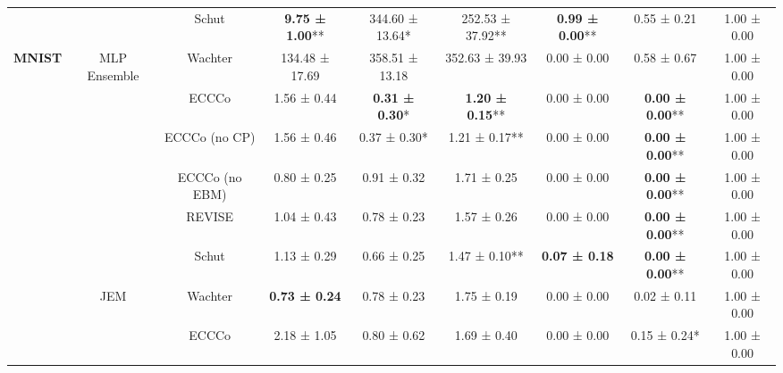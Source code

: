 \begin{table}
{\begin{tabular}[t]{>{}c|c|c|c|c|c|c|c|c}
 &  & Schut & \textbf{9.75 ± 1.00}** & 344.60 ± 13.64*\hphantom{*} & 252.53 ± 37.92** & \textbf{0.99 ± 0.00}** & 0.55 ± 0.21\hphantom{*}\hphantom{*} & 1.00 ± 0.00\hphantom{*}\hphantom{*}\\

\multirow{-16}{*}{\centering\arraybackslash \textbf{MNIST}} & \multirow{-4}{*}{\centering\arraybackslash MLP Ensemble} & Wachter & 134.48 ± 17.69\hphantom{*}\hphantom{*} & 358.51 ± 13.18\hphantom{*}\hphantom{*} & 352.63 ± 39.93\hphantom{*}\hphantom{*} & 0.00 ± 0.00\hphantom{*}\hphantom{*} & 0.58 ± 0.67\hphantom{*}\hphantom{*} & 1.00 ± 0.00\hphantom{*}\hphantom{*}\\
\cline{1-9}
 &  & ECCCo & 1.56 ± 0.44\hphantom{*}\hphantom{*} & \textbf{0.31 ± 0.30}*\hphantom{*} & \textbf{1.20 ± 0.15}** & 0.00 ± 0.00\hphantom{*}\hphantom{*} & \textbf{0.00 ± 0.00}** & 1.00 ± 0.00\hphantom{*}\hphantom{*}\\

 &  & ECCCo (no CP) & 1.56 ± 0.46\hphantom{*}\hphantom{*} & 0.37 ± 0.30*\hphantom{*} & 1.21 ± 0.17** & 0.00 ± 0.00\hphantom{*}\hphantom{*} & \textbf{0.00 ± 0.00}** & 1.00 ± 0.00\hphantom{*}\hphantom{*}\\

 &  & ECCCo (no EBM) & 0.80 ± 0.25\hphantom{*}\hphantom{*} & 0.91 ± 0.32\hphantom{*}\hphantom{*} & 1.71 ± 0.25\hphantom{*}\hphantom{*} & 0.00 ± 0.00\hphantom{*}\hphantom{*} & \textbf{0.00 ± 0.00}** & 1.00 ± 0.00\hphantom{*}\hphantom{*}\\

 &  & REVISE & 1.04 ± 0.43\hphantom{*}\hphantom{*} & 0.78 ± 0.23\hphantom{*}\hphantom{*} & 1.57 ± 0.26\hphantom{*}\hphantom{*} & 0.00 ± 0.00\hphantom{*}\hphantom{*} & \textbf{0.00 ± 0.00}** & 1.00 ± 0.00\hphantom{*}\hphantom{*}\\

 &  & Schut & 1.13 ± 0.29\hphantom{*}\hphantom{*} & 0.66 ± 0.25\hphantom{*}\hphantom{*} & 1.47 ± 0.10** & \textbf{0.07 ± 0.18}\hphantom{*}\hphantom{*} & \textbf{0.00 ± 0.00}** & 1.00 ± 0.00\hphantom{*}\hphantom{*}\\

 & \multirow{-6}{*}{\centering\arraybackslash JEM} & Wachter & \textbf{0.73 ± 0.24}\hphantom{*}\hphantom{*} & 0.78 ± 0.23\hphantom{*}\hphantom{*} & 1.75 ± 0.19\hphantom{*}\hphantom{*} & 0.00 ± 0.00\hphantom{*}\hphantom{*} & 0.02 ± 0.11\hphantom{*}\hphantom{*} & 1.00 ± 0.00\hphantom{*}\hphantom{*}\\
\cline{2-9}
 &  & ECCCo & 2.18 ± 1.05\hphantom{*}\hphantom{*} & 0.80 ± 0.62\hphantom{*}\hphantom{*} & 1.69 ± 0.40\hphantom{*}\hphantom{*} & 0.00 ± 0.00\hphantom{*}\hphantom{*} & 0.15 ± 0.24*\hphantom{*} & 1.00 ± 0.00\hphantom{*}\hphantom{*}\\


\end{tabular}}
\end{table}
